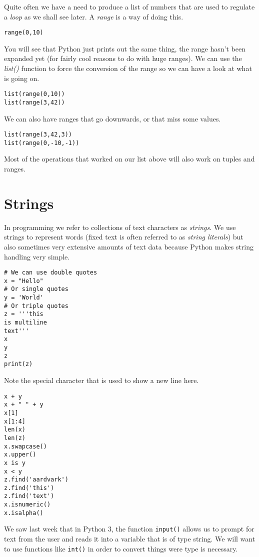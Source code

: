 \documentclass[12pt,oneside]{cttutorial}
\begin{document}
Quite often we have a need to produce a list of numbers that are used to regulate a \emph{loop} as we shall see later. A \emph{range} is a way of doing this.

\begin{lstlisting}
range(0,10)
\end{lstlisting}

You will see that Python just prints out the same thing, the range hasn't been expanded yet (for fairly cool reasons to do with huge ranges). We can use the \emph{list()} function to force the conversion of the range so we can have a look at what is going on.

\begin{lstlisting}
list(range(0,10))
list(range(3,42))
\end{lstlisting}

We can also have ranges that go downwards, or that miss some values.

\begin{lstlisting}
list(range(3,42,3))
list(range(0,-10,-1))
\end{lstlisting}

Most of the operations that worked on our list above will also work on tuples and ranges.

\section{Strings}

In programming we refer to collections of text characters as \emph{strings}. We use strings to represent words (fixed text is often referred to as \emph{string literals}) but also sometimes very extensive amounts of text data because Python makes string handling very simple.

\begin{lstlisting}
# We can use double quotes
x = "Hello"
# Or single quotes
y = 'World'
# Or triple quotes
z = '''this
is multiline
text'''
x
y
z
print(z)
\end{lstlisting}

Note the special character that is used to show a new line here.

\begin{lstlisting}
x + y
x + " " + y
x[1]
x[1:4]
len(x)
len(z)
x.swapcase()
x.upper()
x is y
x < y
z.find('aardvark')
z.find('this')
z.find('text')
x.isnumeric()
x.isalpha()
\end{lstlisting}

We saw last week that in Python 3, the function \lstinline!input()! allows us to prompt for text from the user and reads it into a variable that is of type string. We will want to use functions like \lstinline!int()! in order to convert things were type is necessary.
\end{document}
